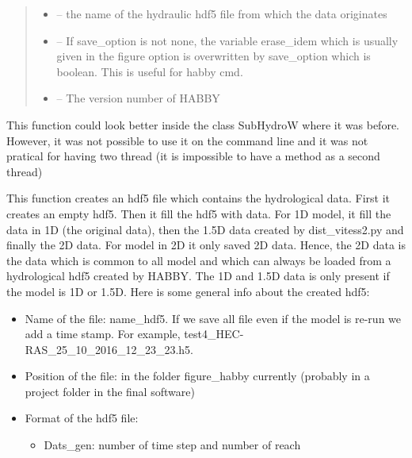 \documentclass[letterpaper,10pt,english]{sphinxmanual}
\begin{document}
\begin{fulllineitems}
\begin{quote}
\begin{description}
\begin{itemize}
\item {} 
 -- the name of the hydraulic hdf5 file from which the data originates

\item {} 
 -- If save\_option is not none, the variable erase\_idem which is usually given in the figure option
is overwritten by save\_option which is boolean. This is useful for habby cmd.

\item {} 
 -- The version number of HABBY

\end{itemize}

\end{description}\end{quote}


This function could look better inside the class SubHydroW where it was before. However, it was not possible
to use it on the command line and it was not pratical for having two thread (it is impossible to have a method
as a second thread)

This function creates an hdf5 file which contains the hydrological data. First it creates an empty hdf5.
Then it fill the hdf5 with data. For 1D model, it fill the data in 1D (the original data), then the 1.5D data
created by dist\_vitess2.py and finally the 2D data. For model in 2D it only saved 2D data. Hence, the 2D data
is the data which is common to all model and which can always be loaded from a hydrological hdf5 created by
HABBY. The 1D and 1.5D data is only present if the model is 1D or 1.5D. Here is some general info about the
created hdf5:
\begin{itemize}
\item {} 
Name of the file: name\_hdf5. If we save all file even if the model is re-run we add a time stamp.
For example, test4\_HEC-RAS\_25\_10\_2016\_12\_23\_23.h5.

\item {} 
Position of the file: in the folder  figure\_habby currently (probably in a project folder in the final software)

\item {} 
Format of the hdf5 file:
\begin{itemize}
\item {} 
Dats\_gen:  number of time step and number of reach


\end{itemize}
\end{itemize}
\end{fulllineitems}
\end{document}
